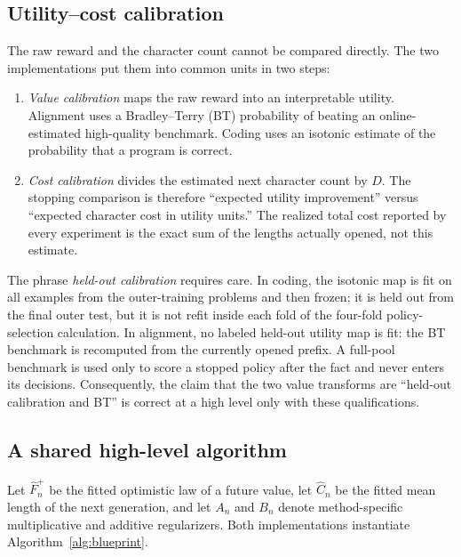 \subsection{Utility--cost calibration}
\label{sec:utility-cost-calibration}

The raw reward and the character count cannot be compared directly.  The two
implementations put them into common units in two steps:
\begin{enumerate}
  \item \emph{Value calibration} maps the raw reward into an interpretable
  utility.  Alignment uses a Bradley--Terry (BT) probability of beating an
  online-estimated high-quality benchmark.  Coding uses an isotonic estimate
  of the probability that a program is correct.
  \item \emph{Cost calibration} divides the estimated next character count by
  $D$.  The stopping comparison is therefore ``expected utility improvement''
  versus ``expected character cost in utility units.''  The realized total
  cost reported by every experiment is the exact sum of the lengths actually
  opened, not this estimate.
\end{enumerate}

The phrase \emph{held-out calibration} requires care.  In coding, the isotonic
map is fit on all examples from the outer-training problems and then frozen;
it is held out from the final outer test, but it is not refit inside each fold
of the four-fold policy-selection calculation.  In alignment, no labeled
held-out utility map is fit: the BT benchmark is recomputed from the currently
opened prefix.  A full-pool benchmark is used only to score a stopped policy
after the fact and never enters its decisions.  Consequently, the claim that
the two value transforms are ``held-out calibration and BT'' is correct at a
high level only with these qualifications.

\subsection{A shared high-level algorithm}

Let $\widehat F_n^+$ be the fitted optimistic law of a future value, let
$\widehat C_n$ be the fitted mean length of the next generation, and let
$A_n$ and $B_n$ denote method-specific multiplicative and additive
regularizers.  Both implementations instantiate Algorithm~\ref{alg:blueprint}.


